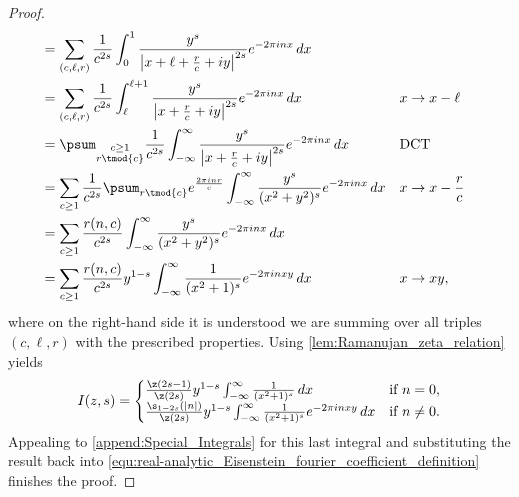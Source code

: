 \begin{proof}
\begin{align*}
          &= \sum_{(c,\ell,r)}\frac{1}{c^{2s}}\int_{0}^{1}\frac{y^{s}}{\left|x+\ell+\frac{r}{c}+iy\right|^{2s}}e^{-2\pi inx}\,dx \\
          &= \sum_{(c,\ell,r)}\frac{1}{c^{2s}}\int_{\ell}^{\ell+1}\frac{y^{s}}{\left|x+\frac{r}{c}+iy\right|^{2s}}e^{-2\pi inx}\,dx &&\text{$x \to x-\ell$} \\
          &= \psum_{\substack{c \ge 1 \\ r \tmod{c}}}\frac{1}{c^{2s}}\int_{-\infty}^{\infty}\frac{y^{s}}{\left|x+\frac{r}{c}+iy\right|^{2s}}e^{-2\pi inx}\,dx &&\text{DCT} \\
          &= \sum_{c \ge 1}\frac{1}{c^{2s}}\psum_{r \tmod{c}}e^{\frac{2\pi inr}{c}}\int_{-\infty}^{\infty}\frac{y^{s}}{(x^{2}+y^{2})^{s}}e^{-2\pi inx}\,dx &&\text{$x \to x-\frac{r}{c}$} \\
          &= \sum_{c \ge 1}\frac{r(n,c)}{c^{2s}}\int_{-\infty}^{\infty}\frac{y^{s}}{(x^{2}+y^{2})^{s}}e^{-2\pi inx}\,dx \\
          &= \sum_{c \ge 1}\frac{r(n,c)}{c^{2s}}y^{1-s}\int_{-\infty}^{\infty}\frac{1}{(x^{2}+1)^{s}}e^{-2\pi inxy}\,dx && \text{$x \to xy$},
        \end{align*}
        where on the right-hand side it is understood we are summing over all triples $(c,\ell,r)$ with the prescribed properties. Using \cref{lem:Ramanujan_zeta_relation} yields
        \[
          I(z,s) = \begin{cases} \frac{\z(2s-1)}{\z(2s)}y^{1-s}\int_{-\infty}^{\infty}\frac{1}{(x^{2}+1)^{s}}\,dx & \text{if $n = 0$}, \\ \frac{\s_{1-2s}(|n|)}{\z(2s)}y^{1-s}\int_{-\infty}^{\infty}\frac{1}{(x^{2}+1)^{s}}e^{-2\pi inxy}\,dx & \text{if $n \neq 0$}. \end{cases}
        \]
        Appealing to \cref{append:Special_Integrals} for this last integral and substituting the result back into \cref{equ:real-analytic_Eisenstein_fourier_coefficient_definition} finishes the proof.
      \end{proof}

